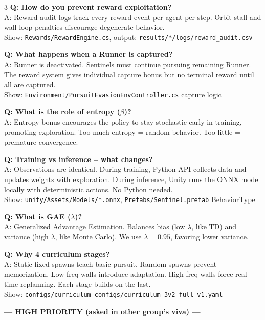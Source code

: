\documentclass[10pt,landscape,a4paper]{article}
\begin{document}
\begin{multicols}{3}
\textbf{Q: How do you prevent reward exploitation?} \\
A: Reward audit logs track every reward event per agent per step. Orbit stall and wall loop penalties discourage degenerate behavior. \\
{\scriptsize\color{gray} Show: \texttt{Rewards/RewardEngine.cs}, output: \texttt{results/*/logs/reward\_audit.csv}}

\textbf{Q: What happens when a Runner is captured?} \\
A: Runner is deactivated. Sentinels must continue pursuing remaining Runner. The reward system gives individual capture bonus but no terminal reward until all are captured. \\
{\scriptsize\color{gray} Show: \texttt{Environment/PursuitEvasionEnvController.cs} capture logic}

\textbf{Q: What is the role of entropy ($\beta$)?} \\
A: Entropy bonus encourages the policy to stay stochastic early in training, promoting exploration. Too much entropy = random behavior. Too little = premature convergence.

\textbf{Q: Training vs inference -- what changes?} \\
A: Observations are identical. During training, Python API collects data and updates weights with exploration. During inference, Unity runs the ONNX model locally with deterministic actions. No Python needed. \\
{\scriptsize\color{gray} Show: \texttt{unity/Assets/Models/*.onnx}, \texttt{Prefabs/Sentinel.prefab} BehaviorType}

\textbf{Q: What is GAE ($\lambda$)?} \\
A: Generalized Advantage Estimation. Balances bias (low $\lambda$, like TD) and variance (high $\lambda$, like Monte Carlo). We use $\lambda = 0.95$, favoring lower variance.

\textbf{Q: Why 4 curriculum stages?} \\
A: Static fixed spawns teach basic pursuit. Random spawns prevent memorization. Low-freq walls introduce adaptation. High-freq walls force real-time replanning. Each stage builds on the last. \\
{\scriptsize\color{gray} Show: \texttt{configs/curriculum\_configs/curriculum\_3v2\_full\_v1.yaml}}

\vspace{3pt}
{\color{red!70!black}\textbf{--- HIGH PRIORITY (asked in other group's viva) ---}}


\end{multicols}
\end{document}
